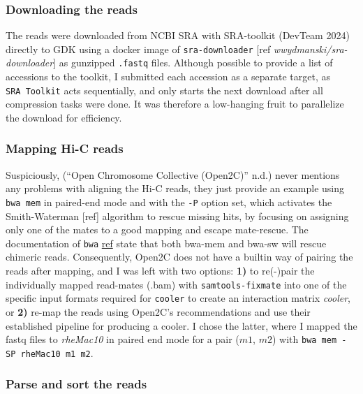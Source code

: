 \documentclass[
  11pt,
  a4paper,
]{scrbook}
\let\oldemph\emph
\renewcommand\emph[1]{\oldemph{\color{gray}#1}}
\begin{document}
\subsubsection{Downloading the reads}\label{downloading-the-reads}

The reads were downloaded from NCBI SRA with SRA-toolkit (DevTeam 2024)
directly to GDK using a docker image of \texttt{sra-downloader} {[}ref
\emph{wwydmanski/sra-downloader}{]} as gunzipped \texttt{.fastq} files.
Although possible to provide a list of accessions to the toolkit, I
submitted each accession as a separate target, as \texttt{SRA\ Toolkit}
acts sequentially, and only starts the next download after all
compression tasks were done. It was therefore a low-hanging fruit to
parallelize the download for efficiency.

\subsubsection{Mapping Hi-C reads}\label{mapping-hi-c-reads}

Suspiciously, ({``Open {Chromosome Collective} ({Open2C})''} n.d.) never
mentions any problems with aligning the Hi-C reads, they just provide an
example using \texttt{bwa\ mem} in paired-end mode and with the
\texttt{-P} option set, which activates the Smith-Waterman {[}ref{]}
algorithm to rescue missing hits, by focusing on assigning only one of
the mates to a good mapping and escape mate-rescue. The documentation of
\texttt{bwa} \href{https://bio-bwa.sourceforge.net}{ref} state that both
bwa-mem and bwa-sw will rescue chimeric reads. Consequently, Open2C does
not have a builtin way of pairing the reads after mapping, and I was
left with two options: \textbf{1)} to re(-)pair the individually mapped
read-mates (.bam) with \texttt{samtools-fixmate} into one of the
specific input formats required for \texttt{cooler} to create an
interaction matrix \emph{cooler}, or \textbf{2)} re-map the reads using
Open2C's recommendations and use their established pipeline for
producing a cooler. I chose the latter, where I mapped the fastq files
to \emph{rheMac10} in paired end mode for a pair (\(m1\), \(m2\)) with
\texttt{bwa\ mem\ -SP\ rheMac10\ m1\ m2}.

\subsubsection{Parse and sort the reads}\label{parse-and-sort-the-reads}
\end{document}
